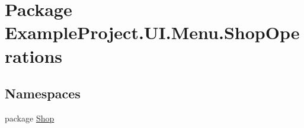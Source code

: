 \hypertarget{namespace_example_project_1_1_u_i_1_1_menu_1_1_shop_operations}{}\section{Package Example\+Project.\+U\+I.\+Menu.\+Shop\+Operations}
\label{namespace_example_project_1_1_u_i_1_1_menu_1_1_shop_operations}
\subsection*{Namespaces}
\begin{DoxyCompactItemize}
\item 
package \hyperlink{namespace_example_project_1_1_u_i_1_1_menu_1_1_shop_operations_1_1_shop}{Shop}
\end{DoxyCompactItemize}

